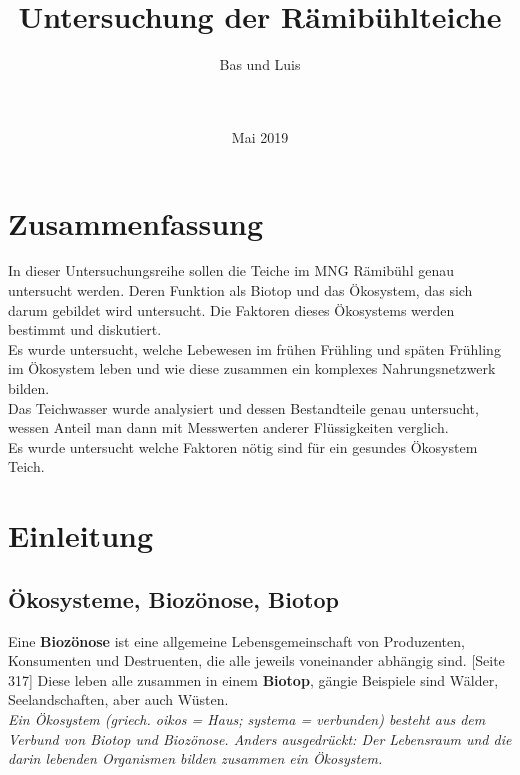 \documentclass{article}
\title{\Huge{Untersuchung der Rämibühlteiche}}
\author{ \huge{Bas und Luis} \\ \\ \\
         \centering{\texttt{[image: Teichtitelbild.JPG]}}}
\date{Mai 2019}
\begin{document}
\maketitle

\newpage


\centering \section{Zusammenfassung}
In dieser Untersuchungsreihe sollen die Teiche im MNG Rämibühl genau untersucht werden. Deren Funktion als Biotop und das Ökosystem, das sich darum gebildet wird untersucht. Die Faktoren dieses Ökosystems werden bestimmt und diskutiert. \\
\vspace{5mm}
Es wurde untersucht, welche Lebewesen im frühen Frühling und späten Frühling im Ökosystem leben und wie diese zusammen ein komplexes Nahrungsnetzwerk bilden. \\
\vspace{5mm}
Das Teichwasser wurde analysiert und dessen Bestandteile genau untersucht, wessen Anteil man dann mit Messwerten anderer Flüssigkeiten verglich. \\
\vspace{5mm}
Es wurde untersucht welche Faktoren nötig sind für ein gesundes Ökosystem Teich. \\


\section{Einleitung}

    \subsection{Ökosysteme, Biozönose, Biotop}
        
        Eine \textbf{Biozönose} ist eine allgemeine Lebensgemeinschaft von Produzenten, Konsumenten und Destruenten, die alle jeweils voneinander abhängig sind. \cite{Biobuch}[Seite 317]
        Diese leben alle zusammen in einem \textbf{Biotop}, gängie Beispiele sind Wälder, Seelandschaften, aber auch Wüsten. \\
        \vspace{5mm}
        \textit{
        Ein Ökosystem (griech. oikos = Haus; systema = verbunden) besteht aus dem Verbund von Biotop und Biozönose. Anders ausgedrückt: Der Lebensraum und die darin lebenden Organismen bilden zusammen ein Ökosystem. \cite{Biologie-schule.de} } \\
        
\end{document}
